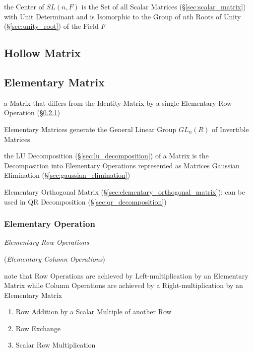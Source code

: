 the Center of $SL(n,F)$ is the Set of all Scalar Matrices
(\S\ref{sec:scalar_matrix}) with Unit Determinant and is Isomorphic to the
Group of $n$th Roots of Unity (\S\ref{sec:unity_root}) of the Field $F$



\subsection{Hollow Matrix}\label{sec:hollow_matrix}

\subsection{Elementary Matrix}\label{sec:elementary_matrix}

a Matrix that differs from the Identity Matrix by a single Elementary Row
Operation (\S\ref{sec:elementary_operation})

Elementary Matrices generate the General Linear Group $GL_n(R)$ of Invertible
Matrices

the LU Decomposition (\S\ref{sec:lu_decomposition}) of a Matrix is the
Decomposition into Elementary Operations represented as Matrices \fist Gaussian
Elimination (\S\ref{sec:gaussian_elimination})

Elementary Orthogonal Matrix (\S\ref{sec:elementary_orthogonal_matrix}): can be
used in QR Decomposition (\S\ref{sec:qr_decomposition})



\subsubsection{Elementary Operation}\label{sec:elementary_operation}

\emph{Elementary Row Operations}

(\emph{Elementary Column Operations})

note that Row Operations are achieved by Left-multiplication by an Elementary
Matrix while Column Operations are achieved by a Right-multiplication by an
Elementary Matrix

\begin{enumerate}
  \item Row Addition by a Scalar Multiple of another Row
  \item Row Exchange
  \item Scalar Row Multiplication
\end{enumerate}


